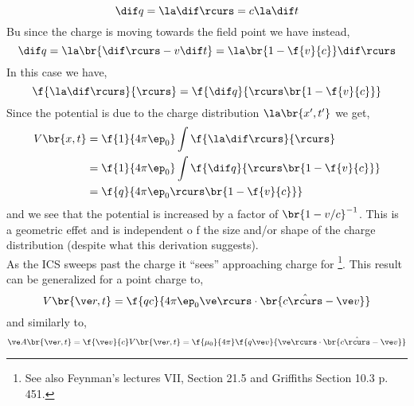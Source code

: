 \documentclass{article}
\begin{document}
\[ \dif q = \la \dif \rcurs = c \la \dif t \]
Bu since the charge is moving towards the field point we have instead,
\[ \dif q = \la \br{\dif \rcurs - v \dif t} = \la \br{1 - \f{v}{c}} \dif \rcurs \]
In this case we have,
\[ \f{\la \dif \rcurs}{\rcurs} = \f{\dif q}{\rcurs \br{1 - \f{v}{c}}} \]
Since the potential is due to the charge distribution $\la \br{x', t'}$ we get,
\begin{align*}
    V\br{x,t}
    &= \f{1}{4\pi\ep_0} \int \f{\la \dif \rcurs}{\rcurs} \\
    &= \f{1}{4\pi\ep_0} \int \f{\dif q}{\rcurs \br{1 - \f{v}{c}}} \\
    &= \f{q}{4\pi\ep_0 \rcurs \br{1 - \f{v}{c}}}
\end{align*}
and we see that the potential is increased by a factor of $\br{1 - v/c}^{-1}$. This is a geometric effet and is independent o f the size and/or shape of the charge distribution (despite what this derivation suggests). \\

As the ICS sweeps past the charge it ``sees'' approaching charge for \footnote{See also Feynman's lectures VII, Section 21.5 and Griffiths Section 10.3 p. 451.}. This result can be generalized for a point charge to,
\[ V\br{\ve r, t} = \f{qc}{4 \pi \ep_0 \ve \rcurs \cdot \br{c \hat \rcurs - \ve v}} \]
and similarly to,
\[ \ve A \br{\ve r, t} = \f{\ve v}{c} V\br{\ve r, t} = \f{\mu_0}{4 \pi}\f{q \ve v}{\ve \rcurs \cdot \br{c \hat \rcurs - \ve v}} \]
\end{document}
